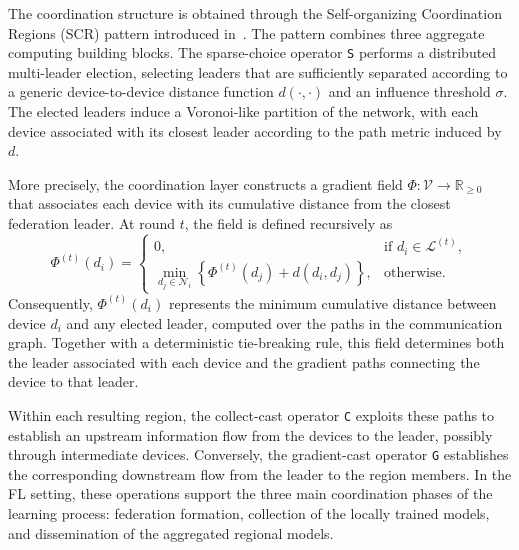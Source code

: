 The coordination structure is obtained through the
Self-organizing Coordination Regions (\gls{SCR}) pattern introduced 
 in~.
%
The pattern combines three aggregate computing building blocks.
%
The sparse-choice operator \texttt{S} performs a distributed multi-leader
election, selecting leaders that are sufficiently separated according to a
generic device-to-device distance function \(d(\cdot,\cdot)\) and an influence
threshold \(\sigma\).
%
The elected leaders induce a Voronoi-like partition of the network, with each
device associated with its closest leader according to the path metric induced
by \(d\).

More precisely, the coordination layer constructs a gradient field
\(\Phi : \mathcal{V} \rightarrow \mathbb{R}_{\geq 0}\) that associates each
device with its cumulative distance from the closest federation leader.
%
At round \(t\), the field is defined recursively as
%
\begin{equation}
  \Phi^{(t)}(d_i) =
  \begin{cases}
    0,
      & \text{if } d_i \in \mathcal{L}^{(t)}, \\[2mm]
    \displaystyle
    \min_{d_j \in \mathcal{N}_i}
    \left\{
      \Phi^{(t)}(d_j) + d(d_i,d_j)
    \right\},
      & \text{otherwise}.
  \end{cases}
  \label{eq:generic-federation-gradient}
\end{equation}
%
Consequently, \(\Phi^{(t)}(d_i)\) represents the minimum cumulative distance
between device \(d_i\) and any elected leader, computed over the paths in the
communication graph.
%
Together with a deterministic tie-breaking rule, this field determines both
the leader associated with each device and the gradient paths connecting the
device to that leader.

Within each resulting region, the collect-cast operator \texttt{C} exploits
these paths to establish an upstream information flow from the devices to the
leader, possibly through intermediate devices.
%
Conversely, the gradient-cast operator \texttt{G} establishes the corresponding
downstream flow from the leader to the region members.
%
In the \gls{FL} setting, these operations support the three main coordination
phases of the learning process: federation formation, collection of the locally
trained models, and dissemination of the aggregated regional models.

